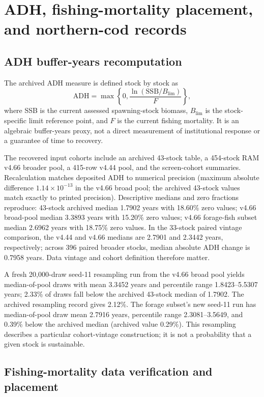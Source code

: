 \section{ADH, fishing-mortality placement, and northern-cod records}\label{si:cross-system}

\subsection{ADH buffer-years recomputation}

The archived ADH measure is defined stock by stock as
\[
\mathrm{ADH}=\max\left\{0,\frac{\ln(\mathrm{SSB}/B_{\lim})}{F}\right\},
\]
where SSB is the current assessed spawning-stock biomass, \(B_{\lim}\) is the stock-specific limit reference point, and \(F\) is the current fishing mortality. It is an algebraic buffer-years proxy, not a direct measurement of institutional response or a guarantee of time to recovery.

The recovered input cohorts include an archived 43-stock table, a 454-stock RAM v4.66 broader pool, a 415-row v4.44 pool, and the screen-cohort summaries. Recalculation matches deposited ADH to numerical precision (maximum absolute difference \(1.14\times10^{-13}\) in the v4.66 broad pool; the archived 43-stock values match exactly to printed precision). Descriptive medians and zero fractions reproduce: 43-stock archived median 1.7902 years with 18.60\% zero values; v4.66 broad-pool median 3.3893 years with 15.20\% zero values; v4.66 forage-fish subset median 2.6962 years with 18.75\% zero values. In the 33-stock paired vintage comparison, the v4.44 and v4.66 medians are 2.7901 and 2.3442 years, respectively; across 396 paired broader stocks, median absolute ADH change is 0.7958 years. Data vintage and cohort definition therefore matter.

A fresh 20,000-draw seed-11 resampling run from the v4.66 broad pool yields median-of-pool draws with mean 3.3452 years and percentile range 1.8423--5.5307 years; 2.33\% of draws fall below the archived 43-stock median of 1.7902. The archived resampling record gives 2.12\%. The forage subset's new seed-11 run has median-of-pool draw mean 2.7916 years, percentile range 2.3081--3.5649, and 0.39\% below the archived median (archived value 0.29\%). This resampling describes a particular cohort-vintage construction; it is not a probability that a given stock is sustainable.

\subsection{Fishing-mortality data verification and placement}

